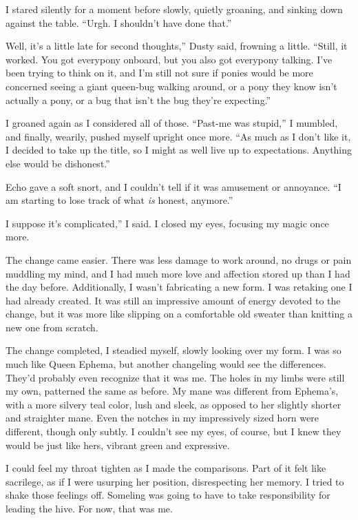 I stared silently for a moment before slowly, quietly groaning, and sinking down against the table. “Urgh. I shouldn’t have done that.”

\leavevmode{}Well, it’s a little late for second thoughts,” Dusty said, frowning a little. “Still, it worked. You got everypony onboard, but you also got everypony talking. I’ve been trying to think on it, and I’m still not sure if ponies would be more concerned seeing a giant queen-bug walking around, or a pony they know isn’t actually a pony, or a bug that isn’t the bug they’re expecting.”

I groaned again as I considered all of those. “Past-me was stupid,” I mumbled, and finally, wearily, pushed myself upright once more. “As much as I don’t like it, I decided to take up the title, so I might as well live up to expectations. Anything else would be dishonest.”

Echo gave a soft snort, and I couldn’t tell if it was amusement or annoyance. “I am starting to lose track of what \textit{is} honest, anymore.”

\leavevmode{}I suppose it’s complicated,” I said. I closed my eyes, focusing my magic once more.

The change came easier. There was less damage to work around, no drugs or pain muddling my mind, and I had much more love and affection stored up than I had the day before. Additionally, I wasn’t fabricating a new form. I was retaking one I had already created. It was still an impressive amount of energy devoted to the change, but it was more like slipping on a comfortable old sweater than knitting a new one from scratch.

The change completed, I steadied myself, slowly looking over my form. I was so much like Queen Ephema, but another changeling would see the differences. They’d probably even recognize that it was me. The holes in my limbs were still my own, patterned the same as before. My mane was different from Ephema’s, with a more silvery teal color, lush and sleek, as opposed to her slightly shorter and straighter mane. Even the notches in my impressively sized horn were different, though only subtly. I couldn’t see my eyes, of course, but I knew they would be just like hers, vibrant green and expressive.

I could feel my throat tighten as I made the comparisons. Part of it felt like sacrilege, as if I were usurping her position, disrespecting her memory. I tried to shake those feelings off. Someling was going to have to take responsibility for leading the hive. For now, that was me.

